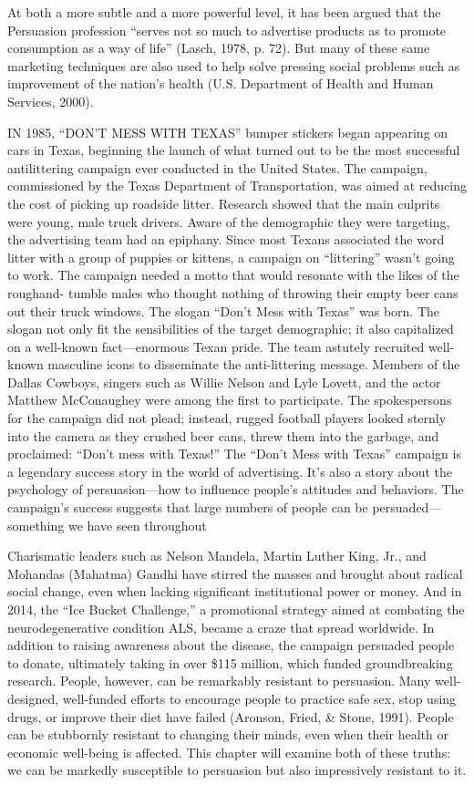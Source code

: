 \documentclass{article} %
\begin{document}
At both a more subtle and a more powerful level, it has been argued that the Persuasion profession “serves not so much to advertise products as to promote consumption as a way of life” (Lasch, 1978, p. 72). But many of these same marketing techniques are also used to help solve pressing social problems such as improvement of the nation's health (U.S. Department of Health and Human Services, 2000).




IN 1985, “DON’T MESS WITH TEXAS” bumper stickers began appearing on cars in
Texas, beginning the launch of what turned out to be the most successful antilittering
campaign ever conducted in the United States. The campaign, commissioned
by the Texas Department of Transportation, was aimed at reducing the
cost of picking up roadside litter. Research showed that the main culprits were
young, male truck drivers. Aware of the demographic they were targeting, the
advertising team had an epiphany. Since most Texans associated the word litter
with a group of puppies or kittens, a campaign on “littering” wasn’t going to work.
The campaign needed a motto that would resonate with the likes of the roughand-
tumble males who thought nothing of throwing their empty beer cans out
their truck windows. The slogan “Don’t Mess with Texas” was born.
The slogan not only fit the sensibilities of the target demographic; it also capitalized
on a well-known fact—enormous Texan pride. The team astutely recruited
well-known masculine icons to disseminate the anti-littering message. Members of
the Dallas Cowboys, singers such as Willie Nelson and Lyle Lovett, and the actor
Matthew McConaughey were among the first to participate. The spokespersons
for the campaign did not plead; instead, rugged football players looked sternly
into the camera as they crushed beer cans, threw them into the garbage, and proclaimed:
“Don’t mess with Texas!”
The “Don’t Mess with Texas” campaign is a legendary success story in the
world of advertising. It’s also a story about the psychology of persuasion—how to
influence people’s attitudes and behaviors. The campaign’s success suggests that
large numbers of people can be persuaded—something we have seen throughout

Charismatic leaders such as Nelson Mandela, Martin Luther
King, Jr., and Mohandas (Mahatma) Gandhi have stirred the masses
and brought about radical social change, even when lacking significant
institutional power or money. And in 2014, the “Ice Bucket
Challenge,” a promotional strategy aimed at combating the neurodegenerative
condition ALS, became a craze that spread worldwide. In
addition to raising awareness about the disease, the campaign persuaded
people to donate, ultimately taking in over \$115 million, which
funded groundbreaking research.
People, however, can be remarkably resistant to persuasion. Many
well-designed, well-funded efforts to encourage people to practice safe sex, stop
using drugs, or improve their diet have failed (Aronson, Fried, & Stone, 1991).
People can be stubbornly resistant to changing their minds, even when their health
or economic well-being is affected. This chapter will examine both of these truths:
we can be markedly susceptible to persuasion but also impressively resistant to it.
\end{document}
